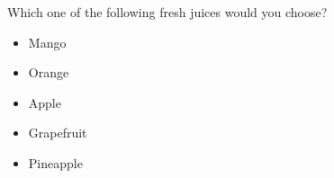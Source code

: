 \begin{tcolorbox}
Which one of the following fresh juices would you choose?

\begin{itemize}
	\setlength\itemsep{-5pt}
	\item Mango
	\item Orange
	\item Apple
	\item Grapefruit
	\item Pineapple
\end{itemize}
\end{tcolorbox}
